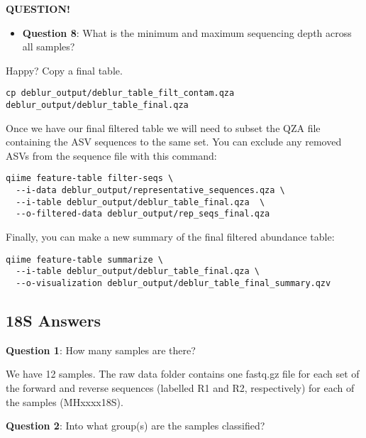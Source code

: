 \documentclass[
]{book}
\providecommand{\tightlist}{%
  \setlength{\itemsep}{0pt}\setlength{\parskip}{0pt}}
\newenvironment{bluebox}{
  \definecolor{shadecolor}{RGB}{172, 210, 237}
  \color{white}
  \begin{shaded}}
 {\end{shaded}}
\begin{document}
\begin{bluebox}

\begin{center}
\textbf{QUESTION!}

\end{center}

\begin{itemize}
\tightlist
\item
  \textbf{Question 8}: What is the minimum and maximum sequencing depth across all samples?
\end{itemize}

\end{bluebox}

Happy? Copy a final table.

\begin{verbatim}
cp deblur_output/deblur_table_filt_contam.qza deblur_output/deblur_table_final.qza
\end{verbatim}

Once we have our final filtered table we will need to subset the QZA file containing the ASV sequences to the same set. You can exclude any removed ASVs from the sequence file with this command:

\begin{verbatim}
qiime feature-table filter-seqs \
  --i-data deblur_output/representative_sequences.qza \
  --i-table deblur_output/deblur_table_final.qza  \
  --o-filtered-data deblur_output/rep_seqs_final.qza
\end{verbatim}

Finally, you can make a new summary of the final filtered abundance table:

\begin{verbatim}
qiime feature-table summarize \
  --i-table deblur_output/deblur_table_final.qza \
  --o-visualization deblur_output/deblur_table_final_summary.qzv
\end{verbatim}

\subsection{18S Answers}\label{s-answers-1}

\textbf{Question 1}: How many samples are there?

We have 12 samples. The raw data folder contains one fastq.gz file for each set of the forward and reverse sequences (labelled R1 and R2, respectively) for each of the samples (MHxxxx18S).

\textbf{Question 2}: Into what group(s) are the samples classified?
\end{document}
